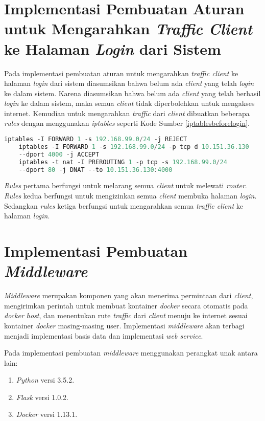   \section{Implementasi Pembuatan Aturan untuk Mengarahkan \textit{Traffic Client} ke Halaman \textit{Login} dari Sistem}
  Pada implementasi pembuatan aturan untuk mengarahkan \textit{traffic client} ke halaman \textit{login} dari sistem diasumsikan bahwa belum ada \textit{client} yang telah \textit{login} ke dalam sistem. Karena diasumsikan bahwa belum ada \textit{client} yang telah berhasil \textit{login} ke dalam sistem, maka semua \textit{client} tidak diperbolehkan untuk mengakses internet. Kemudian untuk mengarahkan \textit{traffic} dari \textit{client} dibuatkan beberapa \textit{rules} dengan menggunakan \textit{iptables} seperti Kode Sumber \ref{iptablesbeforelogin}. \\
  \begin{minipage}{\linewidth}
  	\begin{lstlisting}[caption=Command untuk mengarahkan \textit{client} ke halaman \textit{login},language=Python,label=iptablesbeforelogin]
  	iptables -I FORWARD 1 -s 192.168.99.0/24 -j REJECT
  	iptables -I FORWARD 1 -s 192.168.99.0/24 -p tcp d 10.151.36.130
  	--dport 4000 -j ACCEPT
  	iptables -t nat -I PREROUTING 1 -p tcp -s 192.168.99.0/24
  	--dport 80 -j DNAT --to 10.151.36.130:4000
  	\end{lstlisting}
  \end{minipage}  
  \indent \textit{Rules} pertama berfungsi untuk melarang semua \textit{client} untuk melewati \textit{router}. \textit{Rules} kedua berfungsi untuk mengizinkan semua \textit{client} membuka halaman \textit{login}. Sedangkan \textit{rules} ketiga berfungsi untuk mengarahkan semua \textit{traffic client} ke halaman \textit{login}.
	
  \section{Implementasi Pembuatan \textit{Middleware}}
  \textit{Middleware} merupakan komponen yang akan menerima permintaan dari \textit{client}, mengirimkan perintah untuk membuat kontainer \textit{docker} secara otomatis pada \textit{docker host}, dan menentukan rute \textit{traffic} dari \textit{client} menuju ke internet sesuai kontainer \textit{docker} masing-masing user. Implementasi \textit{middleware} akan terbagi menjadi implementasi basis data dan implementasi \textit{web service}.
  
  Pada implementasi pembuatan \textit{middleware} menggunakan perangkat unak antara lain:
  \begin{enumerate}
	\item \textit{Python} versi 3.5.2.
	\item \textit{Flask} versi 1.0.2.
	\item \textit{Docker} versi 1.13.1.
  \end{enumerate}
  
